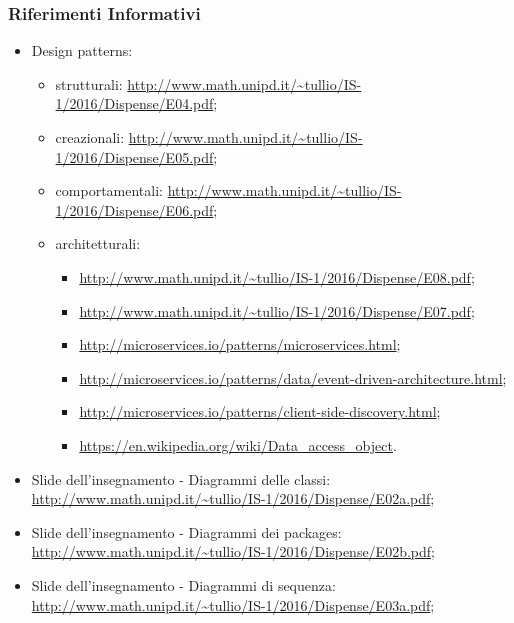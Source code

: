 	 \subsubsection{Riferimenti Informativi}
	  \begin{itemize}
	    \item Design patterns:
	      \begin{itemize}
	       \item strutturali:
	       \url{http://www.math.unipd.it/~tullio/IS-1/2016/Dispense/E04.pdf};
	       \item creazionali:
	       \url{http://www.math.unipd.it/~tullio/IS-1/2016/Dispense/E05.pdf};
	       \item comportamentali:
	       \url{http://www.math.unipd.it/~tullio/IS-1/2016/Dispense/E06.pdf};
	       \item architetturali:
	       \begin{itemize}
	       \item \url{http://www.math.unipd.it/~tullio/IS-1/2016/Dispense/E08.pdf};
	       \item \url{http://www.math.unipd.it/~tullio/IS-1/2016/Dispense/E07.pdf};
	       \item \url{http://microservices.io/patterns/microservices.html};
	       \item \url{http://microservices.io/patterns/data/event-driven-architecture.html};
	       \item \url{http://microservices.io/patterns/client-side-discovery.html};
	       \item \url{https://en.wikipedia.org/wiki/Data_access_object}.
	       \end{itemize}
	      \end{itemize}
	    \item Slide dell’insegnamento - Diagrammi delle classi:
	    \url{http://www.math.unipd.it/~tullio/IS-1/2016/Dispense/E02a.pdf};
	    \item Slide dell’insegnamento - Diagrammi dei packages:
	    \url{http://www.math.unipd.it/~tullio/IS-1/2016/Dispense/E02b.pdf};
	    \item Slide dell’insegnamento - Diagrammi di sequenza:
	    \url{http://www.math.unipd.it/~tullio/IS-1/2016/Dispense/E03a.pdf}; 
	  \end{itemize}
	  
	  